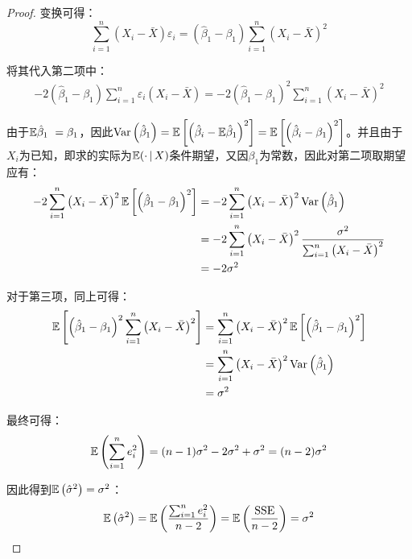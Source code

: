 \documentclass[11pt]{article}
\begin{document}
\begin{proof}
    变换可得：
    \begin{equation*}
        \sum_{i=1}^{n}\left(X_i - \bar{X}\right) \varepsilon_i = \left( \hat{\beta}_1 - \beta_1 \right) \sum_{i=1}^{n} \left( X_i - \bar{X} \right)^2
    \end{equation*}

    将其代入第二项中：
    \begin{align*}
        - 2 \left( \hat{\beta}_1 - \beta_1 \right) \sum_{i=1}^{n} \varepsilon_i \left( X_i - \bar{X} \right)
        = -2 \left( \hat{\beta}_1 - \beta_1 \right)^2 \sum_{i=1}^{n} \left( X_i - \bar{X} \right)^2
    \end{align*}

    由于$\mathbb{E}\hat{\beta}_1\ = \beta_1$，因此$\operatorname{Var}\left( \hat{\beta}_1 \right) = \mathbb{E} \left[ \left( \hat{\beta}_i - \mathbb{E}\hat{\beta}_1 \right)^2 \right] = \mathbb{E} \left[ \left( \hat{\beta}_i - \beta_1 \right)^2 \right]$。并且由于$X_i$为已知，即求的实际为$\mathbb{E}(\cdot \,\vert\, X)$条件期望，又因$\beta_1$为常数，因此对第二项取期望应有：
    \begin{align*}
        -2 \sum_{i=1}^{n} \left( X_i - \bar{X} \right)^2 \mathbb{E} \left[ \left( \hat{\beta}_1 - \beta_1 \right)^2 \right]
        &= -2 \sum_{i=1}^{n} \left( X_i - \bar{X} \right)^2 \operatorname{Var}\left(\hat{\beta}_1\right) \\
        &= -2 \sum_{i=1}^{n} \left( X_i - \bar{X} \right)^2 \frac{\sigma^2}{\sum_{i=1}^{n} \left(X_i - \bar{X}\right)^2} \\
        &= -2 \sigma^2
    \end{align*}

    对于第三项，同上可得：
    \begin{align*}
        \mathbb{E} \left[ \left( \hat{\beta}_1 - \beta_1 \right)^2 \sum_{i=1}^{n} \left( X_i - \bar{X} \right)^2 \right]
        &= \sum_{i=1}^{n} \left( X_i - \bar{X} \right)^2 \mathbb{E} \left[ \left( \hat{\beta}_1 - \beta_1 \right)^2 \right] \\
        &= \sum_{i=1}^{n} \left( X_i - \bar{X} \right)^2 \operatorname{Var}\left(\hat{\beta}_1\right) \\
        &= \sigma^2
    \end{align*}

    最终可得：
    \begin{equation*}
        \mathbb{E}\left( \sum_{i=1}^{n} e_i^2 \right) = (n-1)\sigma^2 - 2\sigma^2 + \sigma^2 = (n-2)\sigma^2
    \end{equation*}

    因此得到$\mathbb{E}\left(\hat{\sigma}^2\right)=\sigma^2$：
    \begin{equation*}
        \mathbb{E}\left( \hat{\sigma}^2 \right) 
        = \mathbb{E} \left( \frac{\sum_{i=1}^{n} e_i^2}{n-2} \right) 
        = \mathbb{E} \left( \frac{\text{SSE}}{n-2} \right) 
        = \sigma^2
    \end{equation*}
\end{proof}
\end{document}
